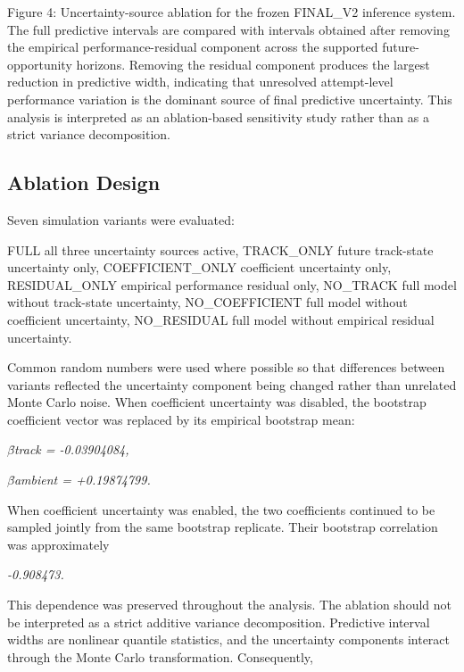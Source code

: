 Figure 4: Uncertainty-source ablation for the frozen FINAL\_V2 inference system. The full predictive intervals are compared with intervals obtained after removing the empirical performance-residual component across the supported future-opportunity horizons. Removing the residual component produces the largest reduction in predictive width, indicating that unresolved attempt-level performance variation is the dominant source of final predictive uncertainty. This analysis is interpreted as an ablation-based sensitivity study rather than as a strict variance decomposition.

\subsection{Ablation Design}
Seven simulation variants were evaluated:

FULL all three uncertainty sources active, TRACK\_ONLY future track-state uncertainty only, COEFFICIENT\_ONLY coefficient uncertainty only, RESIDUAL\_ONLY empirical performance residual only, NO\_TRACK full model without track-state uncertainty, NO\_COEFFICIENT full model without coefficient uncertainty, NO\_RESIDUAL full model without empirical residual uncertainty.

Common random numbers were used where possible so that differences between variants reflected the uncertainty component being changed rather than unrelated Monte Carlo noise. When coefficient uncertainty was disabled, the bootstrap coefficient vector was replaced by its empirical bootstrap mean:

\begin{center}\textit{\ensuremath{\beta}̄track = -0.03904084,}\end{center}

\begin{center}\textit{\ensuremath{\beta}̄ambient = +0.19874799.}\end{center}

When coefficient uncertainty was enabled, the two coefficients continued to be sampled jointly from the same bootstrap replicate. Their bootstrap correlation was approximately

\begin{center}\textit{-0.908473.}\end{center}

This dependence was preserved throughout the analysis. The ablation should not be interpreted as a strict additive variance decomposition. Predictive interval widths are nonlinear quantile statistics, and the uncertainty components interact through the Monte Carlo transformation. Consequently,

